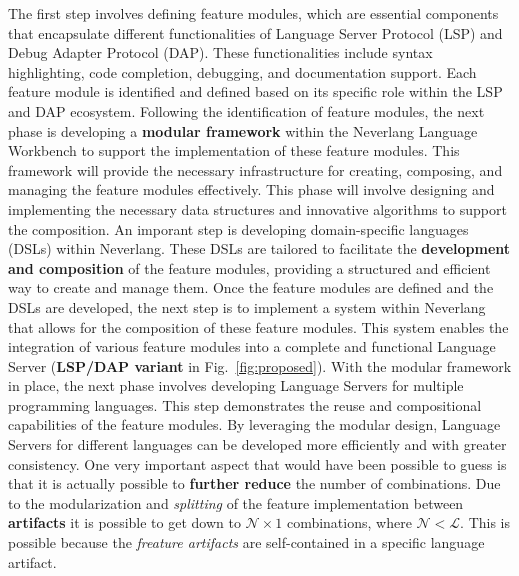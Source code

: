 The first step involves defining feature modules, which are essential components that encapsulate different functionalities of Language Server Protocol (LSP) and Debug Adapter Protocol (DAP). These functionalities include syntax highlighting, code completion, debugging, and documentation support. Each feature module is identified and defined based on its specific role within the LSP and DAP ecosystem. Following the identification of feature modules, the next phase is developing a \textbf{modular framework} within the Neverlang Language Workbench to support the implementation of these feature modules. This framework will provide the necessary infrastructure for creating, composing, and managing the feature modules effectively. This phase will involve designing and implementing the necessary data structures and innovative algorithms to support the composition.
An imporant step is developing domain-specific languages (DSLs) within Neverlang. These DSLs are tailored to facilitate the \textbf{development and composition} of the feature modules, providing a structured and efficient way to create and manage them. Once the feature modules are defined and the DSLs are developed, the next step is to implement a system within Neverlang that allows for the composition of these feature modules. This system enables the integration of various feature modules into a complete and functional Language Server (\textbf{LSP/DAP variant} in Fig.~\ref{fig:proposed}). With the modular framework in place, the next phase involves developing Language Servers for multiple programming languages. This step demonstrates the reuse and compositional capabilities of the feature modules. By leveraging the modular design, Language Servers for different languages can be developed more efficiently and with greater consistency.
One very important aspect that would have been possible to guess is that it is actually possible to \textbf{further reduce} the number of combinations. Due to the modularization and \textit{splitting} of the feature implementation between \textbf{artifacts} it is possible to get down to $\mathcal{N} \times 1$ combinations, where $\mathcal{N} < \mathcal{L}$. This is possible because the \textit{freature artifacts} are self-contained in a specific language artifact.
